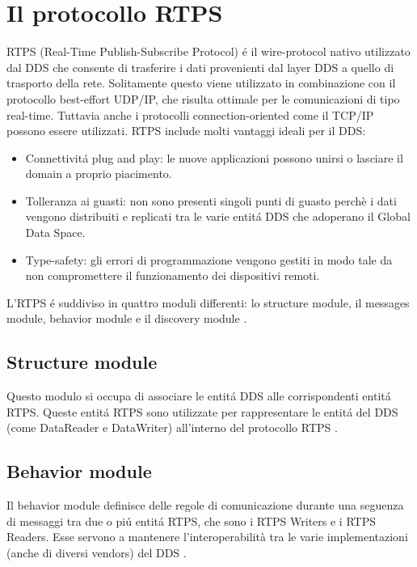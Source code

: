 \section{Il protocollo RTPS}
RTPS (Real-Time Publish-Subscribe Protocol) é il wire-protocol 
nativo utilizzato dal DDS che consente di trasferire i dati provenienti
dal layer DDS a quello di trasporto della rete.
Solitamente questo viene utilizzato in combinazione con il protocollo
best-effort
UDP/IP, che risulta ottimale per le comunicazioni di tipo real-time. Tuttavia 
anche i protocolli connection-oriented come il TCP/IP possono essere utilizzati. 
RTPS include molti vantaggi ideali per il DDS:
\begin{itemize}
    \item Connettivitá plug and play: le nuove applicazioni possono unirsi o 
    lasciare il domain a proprio piacimento.
    \item Tolleranza ai guasti: non sono presenti singoli punti di 
    guasto perchè i dati vengono distribuiti e replicati tra le varie 
    entitá DDS che adoperano il Global Data Space.
    \item Type-safety: gli errori di programmazione vengono gestiti 
    in modo tale da non compromettere il funzionamento 
    dei dispositivi remoti.
\end{itemize}
L'RTPS é suddiviso in quattro moduli differenti: lo structure module, il 
messages module, behavior module e il discovery module \cite{ddsrtps}.

\subsection{Structure module}
Questo modulo si occupa di associare le entitá DDS alle corrispondenti
entitá RTPS. Queste entitá RTPS sono utilizzate 
per rappresentare le entitá del DDS (come DataReader e DataWriter) 
all'interno del protocollo RTPS \cite{ddsrtps}.

\subsection{Behavior module}
Il behavior module definisce delle regole di comunicazione durante 
una seguenza di messaggi tra
due o piú entitá RTPS, che sono i RTPS Writers e i RTPS Readers.
Esse servono a mantenere l'interoperabilità tra le varie 
implementazioni (anche di diversi vendors) del DDS \cite{ddsrtps}.


